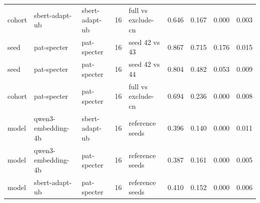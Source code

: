 \begin{tabular}{lllllllll}
cohort & sbert-adapt-ub & sbert-adapt-ub & 16 & full vs exclude-cn & 0.646 & 0.167 & 0.000 & 0.003 \\
seed & pat-specter & pat-specter & 16 & seed 42 vs 43 & 0.867 & 0.715 & 0.176 & 0.015 \\
seed & pat-specter & pat-specter & 16 & seed 42 vs 44 & 0.804 & 0.482 & 0.053 & 0.009 \\
cohort & pat-specter & pat-specter & 16 & full vs exclude-cn & 0.694 & 0.236 & 0.000 & 0.008 \\
model & qwen3-embedding-4b & sbert-adapt-ub & 16 & reference seeds & 0.396 & 0.140 & 0.000 & 0.011 \\
model & qwen3-embedding-4b & pat-specter & 16 & reference seeds & 0.387 & 0.161 & 0.000 & 0.005 \\
model & sbert-adapt-ub & pat-specter & 16 & reference seeds & 0.410 & 0.152 & 0.000 & 0.006 \\
\bottomrule
\end{tabular}
